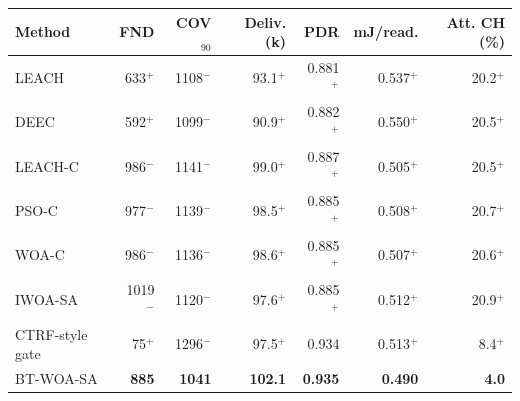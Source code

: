 \begin{tabular}{lrrrrrr}
\toprule
Method & FND & COV$_{90}$ & Deliv. (k) & PDR & mJ/read. & Att. CH (\%) \\
\midrule
LEACH & 633$^{+}$ & 1108$^{-}$ & 93.1$^{+}$ & 0.881$^{+}$ & 0.537$^{+}$ & 20.2$^{+}$ \\
DEEC & 592$^{+}$ & 1099$^{-}$ & 90.9$^{+}$ & 0.882$^{+}$ & 0.550$^{+}$ & 20.5$^{+}$ \\
LEACH-C & 986$^{-}$ & 1141$^{-}$ & 99.0$^{+}$ & 0.887$^{+}$ & 0.505$^{+}$ & 20.5$^{+}$ \\
PSO-C & 977$^{-}$ & 1139$^{-}$ & 98.5$^{+}$ & 0.885$^{+}$ & 0.508$^{+}$ & 20.7$^{+}$ \\
WOA-C & 986$^{-}$ & 1136$^{-}$ & 98.6$^{+}$ & 0.885$^{+}$ & 0.507$^{+}$ & 20.6$^{+}$ \\
IWOA-SA & 1019$^{-}$ & 1120$^{-}$ & 97.6$^{+}$ & 0.885$^{+}$ & 0.512$^{+}$ & 20.9$^{+}$ \\
CTRF-style gate & 75$^{+}$ & 1296$^{-}$ & 97.5$^{+}$ & 0.934 & 0.513$^{+}$ & 8.4$^{+}$ \\
BT-WOA-SA & \textbf{885} & \textbf{1041} & \textbf{102.1} & \textbf{0.935} & \textbf{0.490} & \textbf{4.0} \\
\bottomrule
\end{tabular}
